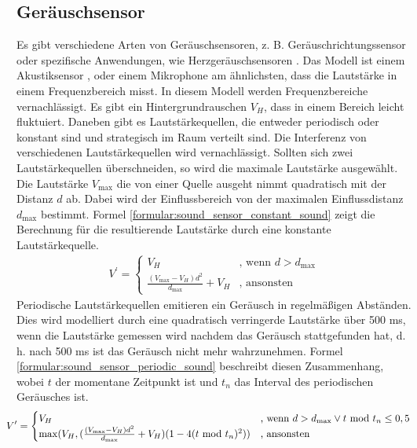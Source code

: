 \subsection{Geräuschsensor}
Es gibt verschiedene Arten von Geräuschsensoren, z. B. Geräuschrichtungssensor \cite{tiete2014soundcompass} oder
spezifische Anwendungen, wie Herzgeräuschsensoren \cite{zhang2016design}.
Das Modell ist einem Akustiksensor \cite{sessler1991acoustic}, oder einem Mikrophone am ähnlichsten,
dass die Lautstärke in einem Frequenzbereich misst.
\newline
\newline
In diesem Modell werden Frequenzbereiche vernachlässigt.
Es gibt ein Hintergrundrauschen $V_H$, dass in einem Bereich leicht fluktuiert.
Daneben gibt es Lautstärkequellen, die entweder periodisch oder konstant sind und strategisch im Raum verteilt sind.
Die Interferenz von verschiedenen Lautstärkequellen wird vernachlässigt.
Sollten sich zwei Lautstärkequellen überschneiden, so wird die maximale Lautstärke ausgewählt.
\newline
\newline
Die Lautstärke $V_{\max}$ die von einer Quelle ausgeht nimmt quadratisch mit der Distanz $d$ ab.
Dabei wird der Einflussbereich von der maximalen Einflussdistanz $d_{\max}$ bestimmt.
Formel \ref{formular:sound_sensor_constant_sound} zeigt die Berechnung für die resultierende Lautstärke durch eine konstante Lautstärkequelle.
\begin{align}
    \label{formular:sound_sensor_constant_sound}
    V^{\prime} = \begin{cases}
                     V_H & \text{, wenn } d > d_{\max} \\
                     \frac{(V_{\max} - V_H)d^2}{d_{\max}} + V_H & \text{, ansonsten}
    \end{cases}
\end{align}
Periodische Lautstärkequellen emitieren ein Geräusch in regelmäßigen Abständen.
Dies wird modelliert durch eine quadratisch verringerde Lautstärke über 500 ms,
wenn die Lautstärke gemessen wird nachdem das Geräusch stattgefunden hat,
d. h. nach 500 ms ist das Geräusch nicht mehr wahrzunehmen.
Formel \ref{formular:sound_sensor_periodic_sound} beschreibt diesen Zusammenhang,
wobei $t$ der momentane Zeitpunkt ist und $t_{n}$ das Interval des periodischen Geräusches ist.
\begin{align}
    \label{formular:sound_sensor_periodic_sound}
    \hspace{-0.4cm}
    V^{\prime} = \begin{cases}
                     V_H & \text{, wenn } d > d_{\max} \vee t\ \text{mod}\ t_{n}\leq 0,5 \\
                     \max(V_H, (\frac{(V_{\max} - V_H)d^2}{d_{\max}} + V_H)(1 - 4(t\ \text{mod}\ t_{n})^2)) & \text{, ansonsten}
    \end{cases}
\end{align}

